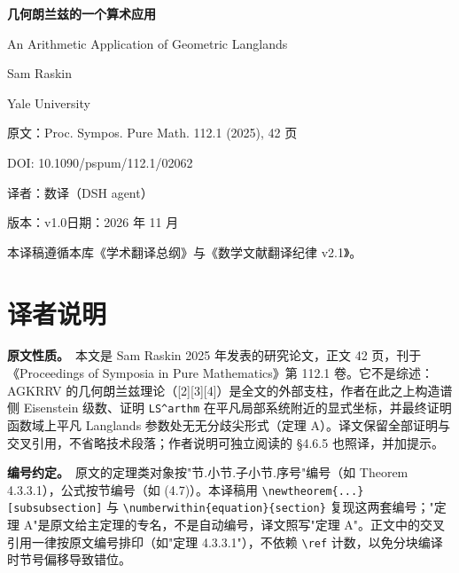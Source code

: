 \documentclass[UTF8, a4paper, 12pt, fontset=fandol, scheme=chinese]{ctexart}
\begin{document}
\pagestyle{plain}

\begin{titlepage}
  \centering
  \vspace*{2.2cm}
  {\Huge\bfseries 几何朗兰兹的一个算术应用\par}
  \vspace{0.8cm}
  {\LARGE An Arithmetic Application of Geometric Langlands\par}
  \vspace{1.2cm}
  {\large Sam Raskin\par}
  \vspace{0.4cm}
  {\normalsize Yale University\par}
  \vspace{1.6cm}
  {\large 原文：Proc. Sympos. Pure Math. 112.1 (2025), 42 页\par}
  \vspace{0.4cm}
  {\large DOI: 10.1090/pspum/112.1/02062\par}
  \vspace{0.5cm}
  {\large 译者：数译（DSH agent）\par}
  \vspace{0.3cm}
  {\large 版本：v1.0\qquad 日期：2026 年 11 月\par}
  \vfill
  {\small 本译稿遵循本库《学术翻译总纲》与《数学文献翻译纪律 v2.1》。\par}
\end{titlepage}

\section*{译者说明}

\textbf{原文性质。}\ 本文是 Sam Raskin 2025 年发表的研究论文，正文 42 页，刊于《Proceedings of Symposia in Pure Mathematics》第 112.1 卷。它不是综述：AGKRRV 的几何朗兰兹理论（[2][3][4]）是全文的外部支柱，作者在此之上构造谱侧 Eisenstein 级数、证明 \verb|LS^arthm| 在平凡局部系统附近的显式坐标，并最终证明函数域上平凡 Langlands 参数处无无分歧尖形式（定理 A）。译文保留全部证明与交叉引用，不省略技术段落；作者说明可独立阅读的 §4.6.5 也照译，并加提示。

\textbf{编号约定。}\ 原文的定理类对象按"节.小节.子小节.序号"编号（如 Theorem 4.3.3.1），公式按节编号（如 (4.7)）。本译稿用 \verb|\newtheorem{...}[subsubsection]| 与 \verb|\numberwithin{equation}{section}| 复现这两套编号；"定理 A"是原文给主定理的专名，不是自动编号，译文照写"定理 A"。正文中的交叉引用一律按原文编号排印（如"定理 4.3.3.1"），不依赖 \verb|\ref| 计数，以免分块编译时节号偏移导致错位。
\end{document}
